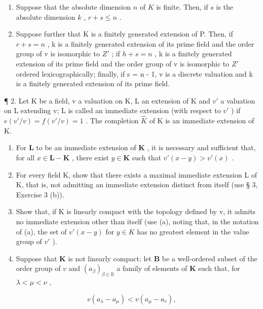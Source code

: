 \begin{enumerate}
\def\labelenumi{(\alph{enumi})}
\item
  Suppose that the absolute dimension \(n\) of \(K\) is finite. Then, if \(s\) is the absolute dimension \(k\) , \(r + s \leqslant n\) .
\item
  Suppose further that K is a finitely generated extension of P. Then, if \(r + s = n\) , k is a finitely generated extension of its prime field and the order group of v is isomorphic to \(Z'\) ; if \(h + s = n\) , k is a finitely generated extension of its prime field and the order group of v is isomorphic to \(Z'\) ordered lexicographically; finally, if s = n - 1, v is a discrete valuation and k is a finitely generated extension of its prime field.
\end{enumerate}

¶ 2. Let K be a field, v a valuation on K, L an extension of K and \(v'\) a valuation on L extending v; L is called an immediate extension (with respect to \(v'\) ) if \(e(v'/v) = f(v'/v) = 1\) . The completion \(\hat{K}\) of K is an immediate extension of K.

\begin{enumerate}
\def\labelenumi{(\alph{enumi})}
\item
  For \(\mathbf{L}\) to be an immediate extension of \(\mathbf{K}\) , it is necessary and sufficient that, for all \(x \in \mathbf{L} - \mathbf{K}\) , there exist \(y \in \mathbf{K}\) such that \(v'(x - y) > v'(x)\) .
\item
  For every field K, show that there exists a maximal immediate extension L of K, that is, not admitting an immediate extension distinct from itself (use § 3, Exercise 3 (b)).
\item
  Show that, if K is linearly compact with the topology defined by v, it admits no immediate extension other than itself (use (a), noting that, in the notation of (a), the set of \(v'(x - y)\) for \(y \in K\) has no greatest element in the value group of \(v'\) ).
\item
  Suppose that \(\mathbf{K}\) is not linearly compact; let \(\mathbf{B}\) be a well-ordered subset of the order group of \(v\) and \((a_{\beta})_{\beta \in \mathbb{B}}\) a family of elements of \(\mathbf{K}\) such that, for \(\lambda < \mu < \nu\) ,
\end{enumerate}

\[
v (a _ {\lambda} - a _ {\mu}) <   v (a _ {\mu} - a _ {v}),
\]

